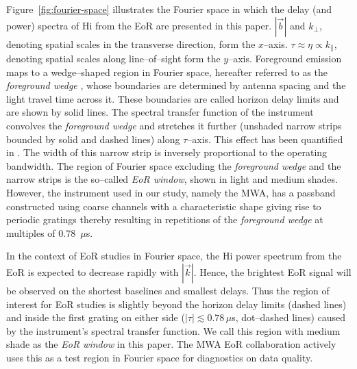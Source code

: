 \documentclass[preprint2,iop,numberedappendix]{emulateapj}
\begin{document}
Figure~\ref{fig:fourier-space} illustrates the Fourier space in which the delay (and power) spectra of H{\sc i} from the EoR are presented in this paper. $|\vec{b}|$ and $k_\perp$, denoting spatial scales in the transverse direction, form the $x$--axis. $\tau\approx\eta\propto k_\parallel$, denoting spatial scales along line--of--sight form the $y$--axis. Foreground emission maps to a wedge--shaped region in Fourier space, hereafter referred to as the {\it foreground wedge} \citep{dat10}, whose boundaries are determined by antenna spacing and the light travel time across it. These boundaries are called horizon delay limits and are shown by solid lines. The spectral transfer function of the instrument convolves the {\it foreground wedge} and stretches it further (unshaded narrow strips bounded by solid and dashed lines) along $\tau$--axis. This effect has been quantified in \citet{thy13}. The width of this narrow strip is inversely proportional to the operating bandwidth. The region of Fourier space excluding the {\it foreground wedge} and the narrow strips is the so--called {\it EoR window}, shown in light and medium shades. However, the instrument used in our study, namely the MWA, has a passband constructed using coarse channels with a characteristic shape giving rise to periodic gratings thereby resulting in repetitions of the {\it foreground wedge} at multiples of 0.78~$\mu$s. 


In the context of EoR studies in Fourier space, the H{\sc i} power spectrum from the EoR is expected to decrease rapidly with $|\vec{k}|$. Hence, the brightest EoR signal will be observed on the shortest baselines and smallest delays. Thus the region of interest for EoR studies is slightly beyond the horizon delay limits (dashed lines) and inside the first grating on either side ($|\tau| \lesssim 0.78\,\mu$s, dot--dashed lines) caused by the instrument's spectral transfer function. We call this region with medium shade as the {\it EoR window} in this paper. The MWA EoR collaboration actively uses this as a test region in Fourier space for diagnostics on data quality.
\end{document}
